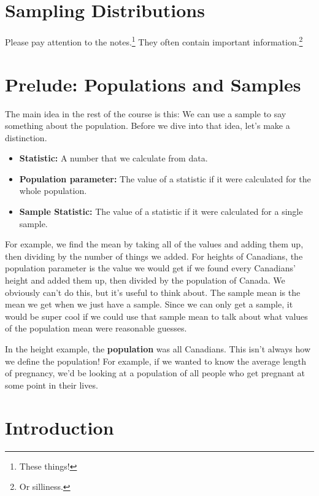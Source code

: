 \documentclass[
  letterpaper,
  DIV=11,
  numbers=noendperiod]{scrreprt}
\providecommand{\tightlist}{%
  \setlength{\itemsep}{0pt}\setlength{\parskip}{0pt}}\usepackage{longtable,booktabs,array}
\begin{document}
\hypertarget{sampling-distributions}{%
\chapter{Sampling Distributions}\label{sampling-distributions}}

Please pay attention to the notes.\footnote{These things!} They often
contain important information.\footnote{Or silliness.}

\hypertarget{prelude-populations-and-samples}{%
\chapter{Prelude: Populations and
Samples}\label{prelude-populations-and-samples}}

The main idea in the rest of the course is this: We can use a sample to
say something about the population. Before we dive into that idea, let's
make a distinction.

\begin{itemize}
\tightlist
\item
  \textbf{Statistic:} A number that we calculate from data.
\item
  \textbf{Population parameter:} The value of a statistic if it were
  calculated for the whole population.
\item
  \textbf{Sample Statistic:} The value of a statistic if it were
  calculated for a single sample.
\end{itemize}

For example, we find the mean by taking all of the values and adding
them up, then dividing by the number of things we added. For heights of
Canadians, the population parameter is the value we would get if we
found every Canadians' height and added them up, then divided by the
population of Canada. We obviously can't do this, but it's useful to
think about. The sample mean is the mean we get when we just have a
sample. Since we can only get a sample, it would be super cool if we
could use that sample mean to talk about what values of the population
mean were reasonable guesses.

In the height example, the \textbf{population} was all Canadians. This
isn't always how we define the population! For example, if we wanted to
know the average length of pregnancy, we'd be looking at a population of
all people who get pregnant at some point in their lives.

\hypertarget{introduction-4}{%
\chapter{Introduction}\label{introduction-4}}
\end{document}
